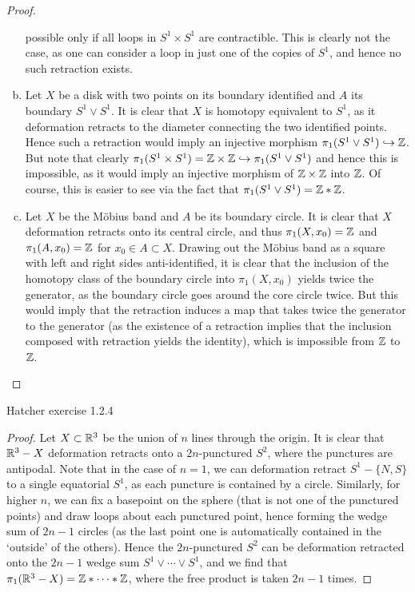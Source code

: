 \documentclass{../../mathnotes}
\begin{document}
\begin{proof}
\begin{enumerate}[(a)]
            possible only if all loops in $S^1\times S^1$ are contractible. This is clearly
            not the case, as one can consider a loop in just one of the copies of $S^1$, and
            hence no such retraction exists.
        \item Let $X$ be a disk with two points on its boundary identified and $A$ its boundary
            $S^1\vee S^1$. It is clear that $X$ is homotopy equivalent to $S^1$, as it deformation
            retracts to the diameter connecting the two identified points. Hence such a retraction
            would imply an injective morphism $\pi_1(S^1\vee S^1)\hookrightarrow \mathbb{Z}$. But note
            that clearly $\pi_1(S^1\times S^1)=\mathbb{Z}\times\mathbb{Z}\hookrightarrow\pi_1(S^1\vee S^1)$
            and hence this is impossible, as it would imply an injective morphism of $\mathbb{Z}\times\mathbb{Z}$
            into $\mathbb{Z}$. Of course, this is easier to see via the fact that $\pi_1(S^1\vee S^1)=\mathbb{Z}*\mathbb{Z}$.
        \item Let $X$ be the M\"obius band and $A$ be its boundary circle. It is clear that $X$
            deformation retracts onto its central circle, and thus $\pi_1(X,x_0)=\mathbb{Z}$ and $\pi_1(A,x_0)=\mathbb{Z}$
            for $x_0\in A\subset X$. Drawing out the M\"obius band as a square with left and right
            sides anti-identified, it is clear that the inclusion of the homotopy class of the boundary
            circle into $\pi_1(X,x_0)$ yields twice the generator, as the boundary circle goes
            around the core circle twice. But this would imply that the retraction induces a map
            that takes twice the generator to the generator (as the existence of a retraction implies
            that the inclusion composed with retraction yields the identity), which is impossible
            from $\mathbb{Z}$ to $\mathbb{Z}$.
    \end{enumerate}
\end{proof}

\begin{prop}
    Hatcher exercise 1.2.4
\end{prop}
\begin{proof}
    Let $X\subset\mathbb{R}^3$ be the union of $n$ lines through the origin. It is clear that $\mathbb{R}^3-X$
    deformation retracts onto a $2n$-punctured $S^2$, where the punctures are antipodal.
    Note that in the case of $n=1$, we can deformation retract $S^1-\{N,S\}$ to a single equatorial
    $S^1$, as each puncture is contained by a circle. Similarly, for higher $n$, we can fix
    a basepoint on the sphere (that is not one of the punctured points) and draw loops about each
    punctured point, hence forming the wedge sum of $2n-1$ circles (as the last point one is
    automatically contained in the `outside' of the others). Hence the $2n$-punctured $S^2$
    can be deformation retracted onto the $2n-1$ wedge sum $S^1\vee\cdots\vee S^1$, and we find
    that $\pi_1(\mathbb{R}^3-X)=\mathbb{Z}*\cdots*\mathbb{Z}$, where the free product is taken $2n-1$ times.
\end{proof}
\end{document}
